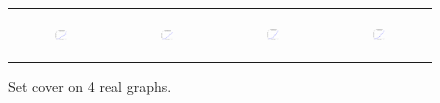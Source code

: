 \begin{figure}[ht]
\begin{tabular}{cccc}
\begin{subfigure}[b]{0.22\textwidth}
	  	\includegraphics[width=110pt]{images/validated_CC2G_friendster10M_setcover.eps}
			\caption{}
			\label{appfig:validated_CC2G_friendster10M_setcover}
	  \end{subfigure} &
	  \begin{subfigure}[b]{0.22\textwidth}
	  	\includegraphics[width=110pt]{images/validated_CC2G_arabic2005_setcover.eps}
			\caption{}
			\label{appfig:validated_CC2G_arabic2005_setcover}
	  \end{subfigure} &
	  \begin{subfigure}[b]{0.22\textwidth}
	  	\includegraphics[width=110pt]{images/validated_CC2G_uk2005_setcover.eps}
			\caption{}
			\label{appfig:validated_CC2G_uk2005_setcover}
	  \end{subfigure} &
	  \begin{subfigure}[b]{0.22\textwidth}
	  	\includegraphics[width=110pt]{images/validated_CC2G_it2004_setcover.eps}
			\caption{}
			\label{appfig:validated_CC2G_it2004_setcover}
	  \end{subfigure} \\
  \end{tabular}
  \caption{Set cover on 4 real graphs.}
\end{figure}



